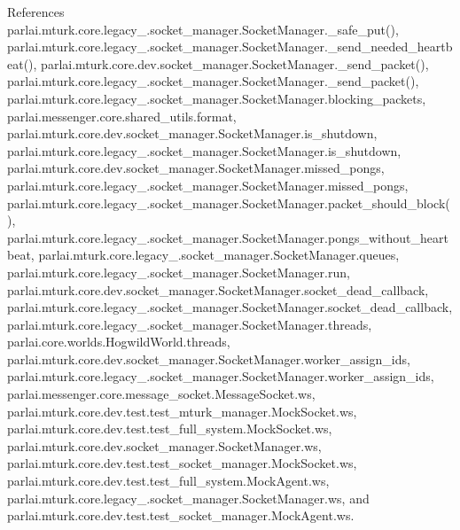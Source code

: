 References parlai.\+mturk.\+core.\+legacy\+\_.\+socket\+\_\+manager.\+Socket\+Manager.\+\_\+safe\+\_\+put(), parlai.\+mturk.\+core.\+legacy\+\_.\+socket\+\_\+manager.\+Socket\+Manager.\+\_\+send\+\_\+needed\+\_\+heartbeat(), parlai.\+mturk.\+core.\+dev.\+socket\+\_\+manager.\+Socket\+Manager.\+\_\+send\+\_\+packet(), parlai.\+mturk.\+core.\+legacy\+\_.\+socket\+\_\+manager.\+Socket\+Manager.\+\_\+send\+\_\+packet(), parlai.\+mturk.\+core.\+legacy\+\_.\+socket\+\_\+manager.\+Socket\+Manager.\+blocking\+\_\+packets, parlai.\+messenger.\+core.\+shared\+\_\+utils.\+format, parlai.\+mturk.\+core.\+dev.\+socket\+\_\+manager.\+Socket\+Manager.\+is\+\_\+shutdown, parlai.\+mturk.\+core.\+legacy\+\_.\+socket\+\_\+manager.\+Socket\+Manager.\+is\+\_\+shutdown, parlai.\+mturk.\+core.\+dev.\+socket\+\_\+manager.\+Socket\+Manager.\+missed\+\_\+pongs, parlai.\+mturk.\+core.\+legacy\+\_.\+socket\+\_\+manager.\+Socket\+Manager.\+missed\+\_\+pongs, parlai.\+mturk.\+core.\+legacy\+\_.\+socket\+\_\+manager.\+Socket\+Manager.\+packet\+\_\+should\+\_\+block(), parlai.\+mturk.\+core.\+legacy\+\_.\+socket\+\_\+manager.\+Socket\+Manager.\+pongs\+\_\+without\+\_\+heartbeat, parlai.\+mturk.\+core.\+legacy\+\_.\+socket\+\_\+manager.\+Socket\+Manager.\+queues, parlai.\+mturk.\+core.\+legacy\+\_.\+socket\+\_\+manager.\+Socket\+Manager.\+run, parlai.\+mturk.\+core.\+dev.\+socket\+\_\+manager.\+Socket\+Manager.\+socket\+\_\+dead\+\_\+callback, parlai.\+mturk.\+core.\+legacy\+\_.\+socket\+\_\+manager.\+Socket\+Manager.\+socket\+\_\+dead\+\_\+callback, parlai.\+mturk.\+core.\+legacy\+\_.\+socket\+\_\+manager.\+Socket\+Manager.\+threads, parlai.\+core.\+worlds.\+Hogwild\+World.\+threads, parlai.\+mturk.\+core.\+dev.\+socket\+\_\+manager.\+Socket\+Manager.\+worker\+\_\+assign\+\_\+ids, parlai.\+mturk.\+core.\+legacy\+\_.\+socket\+\_\+manager.\+Socket\+Manager.\+worker\+\_\+assign\+\_\+ids, parlai.\+messenger.\+core.\+message\+\_\+socket.\+Message\+Socket.\+ws, parlai.\+mturk.\+core.\+dev.\+test.\+test\+\_\+mturk\+\_\+manager.\+Mock\+Socket.\+ws, parlai.\+mturk.\+core.\+dev.\+test.\+test\+\_\+full\+\_\+system.\+Mock\+Socket.\+ws, parlai.\+mturk.\+core.\+dev.\+socket\+\_\+manager.\+Socket\+Manager.\+ws, parlai.\+mturk.\+core.\+dev.\+test.\+test\+\_\+socket\+\_\+manager.\+Mock\+Socket.\+ws, parlai.\+mturk.\+core.\+dev.\+test.\+test\+\_\+full\+\_\+system.\+Mock\+Agent.\+ws, parlai.\+mturk.\+core.\+legacy\+\_.\+socket\+\_\+manager.\+Socket\+Manager.\+ws, and parlai.\+mturk.\+core.\+dev.\+test.\+test\+\_\+socket\+\_\+manager.\+Mock\+Agent.\+ws.

